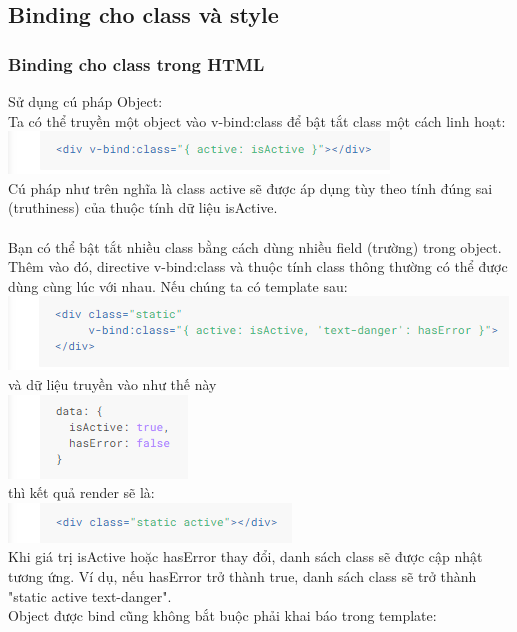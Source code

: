 \documentclass[12pt,a4paper]{report}
\begin{document}
\subsection{Binding cho class và style}
\subsubsection{Binding cho class trong HTML}
Sử dụng cú pháp Object:\\Ta có thể truyền một object vào v-bind:class để bật tắt class một cách linh hoạt:\\
\includegraphics[scale=1]{21}
\\Cú pháp như trên nghĩa là class active sẽ được áp dụng tùy theo tính đúng sai (truthiness) của thuộc tính dữ liệu isActive.\\\\Bạn có thể bật tắt nhiều class bằng cách dùng nhiều field (trường) trong object. Thêm vào đó, directive v-bind:class và thuộc tính class thông thường có thể được dùng cùng lúc với nhau. Nếu chúng ta có template sau:\\
\includegraphics[scale=1]{22}\\ và dữ liệu truyền vào như thế này\\\includegraphics[scale=1]{23}\\ thì kết quả render sẽ là: \\\includegraphics[scale=1]{24}\\Khi giá trị isActive hoặc hasError thay đổi, danh sách class sẽ được cập nhật tương ứng. Ví dụ, nếu hasError trở thành true, danh sách class sẽ trở thành "static active text-danger".
\\Object được bind cũng không bắt buộc phải khai báo trong template:\\
\end{document}
